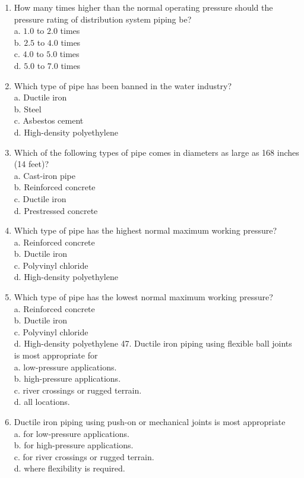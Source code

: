 \documentclass[10pt]{article}
\begin{document}
\begin{enumerate}
  \item How many times higher than the normal operating pressure should the pressure rating of distribution system piping be?\\
a. $1.0$ to $2.0$ times\\
b. $2.5$ to $4.0$ times\\
c. $4.0$ to $5.0$ times\\
d. $5.0$ to $7.0$ times

  \item Which type of pipe has been banned in the water industry?\\
a. Ductile iron\\
b. Steel\\
c. Asbestos cement\\
d. High-density polyethylene

  \item Which of the following types of pipe comes in diameters as large as 168 inches (14 feet)?\\
a. Cast-iron pipe\\
b. Reinforced concrete\\
c. Ductile iron\\
d. Prestressed concrete

  \item Which type of pipe has the highest normal maximum working pressure?\\
a. Reinforced concrete\\
b. Ductile iron\\
c. Polyvinyl chloride\\
d. High-density polyethylene

  \item Which type of pipe has the lowest normal maximum working pressure?\\
a. Reinforced concrete\\
b. Ductile iron\\
c. Polyvinyl chloride\\
d. High-density polyethylene 47. Ductile iron piping using flexible ball joints is most appropriate for\\
a. low-pressure applications.\\
b. high-pressure applications.\\
c. river crossings or rugged terrain.\\
d. all locations.

  \item Ductile iron piping using push-on or mechanical joints is most appropriate\\
a. for low-pressure applications.\\
b. for high-pressure applications.\\
c. for river crossings or rugged terrain.\\
d. where flexibility is required.


\end{enumerate}
\end{document}
